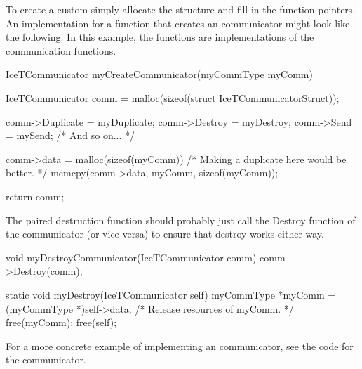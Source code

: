 To create a custom  simply allocate the structure
and fill in the function pointers.  An implementation for a function that
creates an \IceT communicator might look like the following.  In this
example, the  functions are implementations of the communication
functions. 

\begin{code}
IceTCommunicator myCreateCommunicator(myCommType myComm)
{
  IceTCommunicator comm = malloc(sizeof(struct IceTCommunicatorStruct));

  comm->Duplicate = myDuplicate;
  comm->Destroy = myDestroy;
  comm->Send = mySend;
  /* And so on... */

  comm->data = malloc(sizeof(myComm))
  /* Making a duplicate here would be better. */
  memcpy(comm->data, myComm, sizeof(myComm));

  return comm;
}
\end{code}

The paired destruction function should probably just call the Destroy
function of the communicator (or vice versa) to ensure that destroy works
either way.

\begin{code}
void myDestroyCommunicator(IceTCommunicator comm)
{
  comm->Destroy(comm);
}
\end{code}

\begin{code}
static void myDestroy(IceTCommunicator self)
{
  myCommType *myComm = (myCommType *)self->data;
  /* Release resources of myComm. */
  free(myComm);
  free(self);
}
\end{code}

For a more concrete example of implementing an \IceT communicator, see the
\IceT code for the \MPI communicator.
